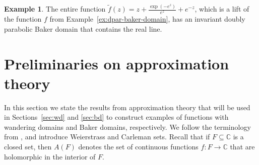 \documentclass[a4paper, 12pt, reqno]{amsart}
\newcommand{\margin}[1]{\marginnote{\red{#1}}}
\numberwithin{equation}{section}
\newcommand{\red}[1]{{\color{red} #1}}
\theoremstyle{plain}
\theoremstyle{definition}
\newtheorem{ex}[thm]{Example}
\theoremstyle{remark}
\newcommand{\C}{{\mathbb{C}}}
\begin{document}
\begin{ex}
The entire function $\tilde{f}(z)=z+\frac{\exp(-e^z)}{e^z}+e^{-z}$, which is a lift of the function $f$ from Example~\ref{ex:dpar-baker-domain}, has an invariant doubly parabolic Baker domain that contains the real line.
\end{ex}

%
%
%
%
%
%


\section{Preliminaries on approximation theory} \label{sec:approx-theory}

In this section we state the results from approximation theory that will be used in Sections~\ref{sec:wd} and \ref{sec:bd} to construct examples of functions with wandering domains and Baker domains, respectively. We follow the terminology from \cite[Chapter~IV]{gaier87}, and introduce Weierstrass and Carleman sets. Recall that if $F\subseteq \C$ is a closed set, then $A(F)$ denotes the set of continuous functions $f:F\to\C$ that are holomorphic in the interior of $F$.

\end{document}
